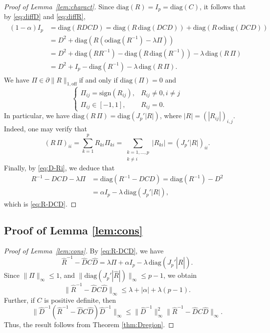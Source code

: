 \documentclass[12pt]{amsart}
\numberwithin{equation}{section}
\numberwithin{equation}{section}
\theoremstyle{plain}
\theoremstyle{definition}
\newcommand{\diag}[1]{\mathrm{diag}(#1)}
\newcommand{\odiag}[1]{\mathrm{odiag}(#1)}
\newcommand{\sign}{\mathrm{sign}}
\begin{document}
\begin{proof}[Proof of Lemma~\ref{lem:charact}]
Since $\diag{R}=I_p=\diag{C}$, it follows that by \eqref{eq:diffD} and \eqref{eq:diffR},
\begin{align}\label{eq:D-Ri}
\begin{split}
    (1-\alpha)I_p &=  \diag{R D C D} = \diag{R\, \diag{D C D}} + \diag{R\, \odiag{D C D}} \\
    &= D^2 + \diag{R  ( \odiag{R^{-1}} - \lambda \Pi )}\\
    &= D^2 + \diag{R  R^{-1}} - \diag{R \, \diag{R^{-1}}}-\lambda\, \diag{R \,\Pi} \\
    &= D^2 + I_p - \diag{R^{-1}} - \lambda\,\diag{R\, \Pi}.
    \end{split}
\end{align}
We have $\Pi\in\partial \|R\|_{1,\mathrm{off}}$if and only if $\diag{\Pi}=0$ and
\[
\begin{cases}
	\Pi_{ij}=\sign(R_{ij}), & R_{ij}\neq 0, i\neq j \\
	\Pi_{ij}\in[-1,1], & R_{ij}=0.
\end{cases}
\]
In particular, we have $\diag{R\,\Pi} = \diag{J_p' |R|}$, where $|R|=(|R_{ij}|)_{i,j}$. Indeed, one may verify that
\[
(R\,\Pi)_{ii} = \sum_{k=1}^p R_{k i}\Pi_{k i}  = \sum_{\substack{k=1,\ldots,p\\ k\neq i}} |R_{ki}| =(J_p' |R|)_{ii}.
\]
Finally, by \eqref{eq:D-Ri}, we deduce that
\begin{align*}
R^{-1}-DCD -\lambda\Pi &= \diag{R^{-1}-DCD} 
=\diag{R^{-1}} - D^2 \\
&=\alpha I_p - \lambda\,\diag{J_p' |R|}, 
\end{align*}
which is \eqref{eq:R-DCD}. 


\end{proof}

\subsection{Proof of Lemma \ref{lem:cons}}

\begin{proof}[Proof of Lemma~\ref{lem:cons}]
    By \eqref{eq:R-DCD}, we have 
    \[
\hat{R}^{-1}-\hat{D} C \hat{D} =  \lambda\Pi + \alpha I_p  - \lambda\,\diag{J_p' |\hat{R}|}.
    \]
Since $\|\Pi\|_\infty\leq 1$, and $\|\diag{J_p' |\hat{R}|}\|_\infty\leq p-1$, we obtain 
\[
\|\hat{R}^{-1}-\hat{D}C\hat{D}\|_\infty\leq \lambda+|\alpha|+\lambda(p-1). 
\]
Further, if $C$ is positive definite, then 
\[
\| \hat{D}^{-1}(\hat{R}^{-1}-\hat{D}C\hat{D})\hat{D}^{-1}\|_\infty \leq \|\hat{D}^{-1}\|_\infty^2 \|\hat{R}^{-1}-\hat{D}C\hat{D}\|_\infty.
\]
Thus, the result follows from Theorem \ref{thm:Dregion}. 
\end{proof}
\end{document}
